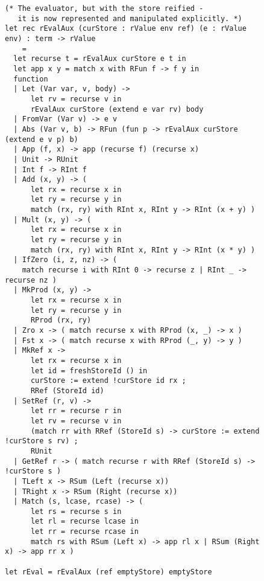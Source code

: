 \begin{figure}[H]
\ContinuedFloat
\begin{verbatim}
(* The evaluator, but with the store reified -
   it is now represented and manipulated explicitly. *)
let rec rEvalAux (curStore : rValue env ref) (e : rValue env) : term -> rValue
    =
  let recurse t = rEvalAux curStore e t in
  let app x y = match x with RFun f -> f y in
  function
  | Let (Var var, v, body) ->
      let rv = recurse v in
      rEvalAux curStore (extend e var rv) body
  | FromVar (Var v) -> e v
  | Abs (Var v, b) -> RFun (fun p -> rEvalAux curStore (extend e v p) b)
  | App (f, x) -> app (recurse f) (recurse x)
  | Unit -> RUnit
  | Int f -> RInt f
  | Add (x, y) -> (
      let rx = recurse x in
      let ry = recurse y in
      match (rx, ry) with RInt x, RInt y -> RInt (x + y) )
  | Mult (x, y) -> (
      let rx = recurse x in
      let ry = recurse y in
      match (rx, ry) with RInt x, RInt y -> RInt (x * y) )
  | IfZero (i, z, nz) -> (
    match recurse i with RInt 0 -> recurse z | RInt _ -> recurse nz )
  | MkProd (x, y) ->
      let rx = recurse x in
      let ry = recurse y in
      RProd (rx, ry)
  | Zro x -> ( match recurse x with RProd (x, _) -> x )
  | Fst x -> ( match recurse x with RProd (_, y) -> y )
  | MkRef x ->
      let rx = recurse x in
      let id = freshStoreId () in
      curStore := extend !curStore id rx ;
      RRef (StoreId id)
  | SetRef (r, v) ->
      let rr = recurse r in
      let rv = recurse v in
      (match rr with RRef (StoreId s) -> curStore := extend !curStore s rv) ;
      RUnit
  | GetRef r -> ( match recurse r with RRef (StoreId s) -> !curStore s )
  | TLeft x -> RSum (Left (recurse x))
  | TRight x -> RSum (Right (recurse x))
  | Match (s, lcase, rcase) -> (
      let rs = recurse s in
      let rl = recurse lcase in
      let rr = recurse rcase in
      match rs with RSum (Left x) -> app rl x | RSum (Right x) -> app rr x )

let rEval = rEvalAux (ref emptyStore) emptyStore
\end{verbatim}
\end{figure}

